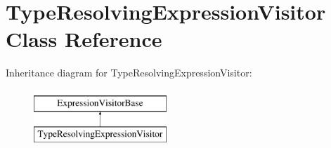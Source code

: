 \hypertarget{class_type_resolving_expression_visitor}{\section{Type\+Resolving\+Expression\+Visitor Class Reference}
\label{class_type_resolving_expression_visitor}
}
Inheritance diagram for Type\+Resolving\+Expression\+Visitor\+:\begin{figure}[H]
\begin{center}
\leavevmode
\includegraphics[height=2.000000cm]{class_type_resolving_expression_visitor}
\end{center}
\end{figure}
